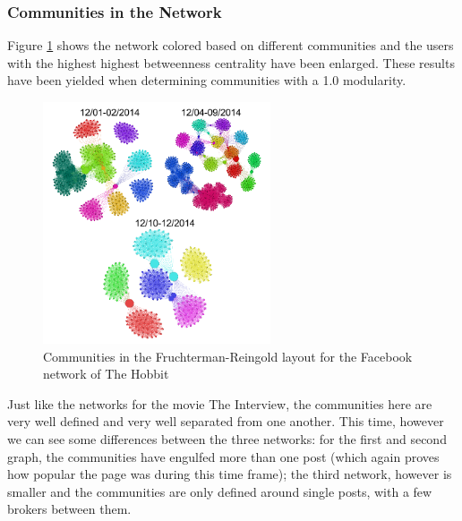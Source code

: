 \documentclass{llncs}
\begin{document}
\subsubsection{Communities in the Network}
Figure \ref{fig:hobbit-facebook-communities} shows the network colored based on
different communities and the users with the highest highest betweenness
centrality have been enlarged. These results have been yielded when determining
communities with a 1.0 modularity.
%
\begin{figure}
\centering
\includegraphics[width=0.6\textwidth]{hobbit-facebook-communities.png}
\caption{Communities in the Fruchterman-Reingold layout for the Facebook network
    of The Hobbit
\label{fig:hobbit-facebook-communities}}
\end{figure}
%
Just like the networks for the movie The Interview, the communities here are
very well defined and very well separated from one another. This time, however
we can see some differences between the three networks: for the first and
second graph, the communities have engulfed more than one post (which again
proves how popular the page was during this time frame); the third network,
however is smaller and the communities are only defined around single posts,
with a few brokers between them.
%
\end{document}
